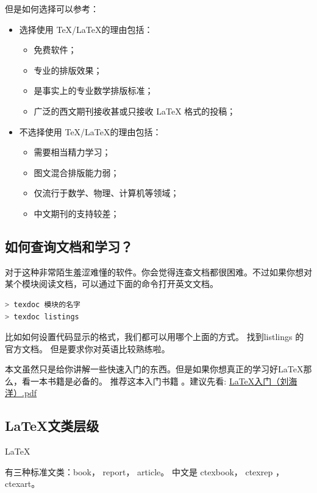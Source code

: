 \documentclass[UTF8,AutoFakeBold]{ctexart}
\numberwithin{figure}{section}
\numberwithin{table}{section}
\begin{document}
但是如何选择可以参考：
\begin{itemize}
    \item \Checkmark 选择使用 \TeX /\LaTeX 的理由包括：

          \begin{itemize}
              \item 免费软件；
              \item 专业的排版效果；
              \item 是事实上的专业数学排版标准；
              \item 广泛的西文期刊接收甚或只接收 LaTeX 格式的投稿；
          \end{itemize}

    \item \Checkmark 不选择使用 \TeX/\LaTeX 的理由包括：
          \begin{itemize}
              \item 需要相当精力学习；
              \item 图文混合排版能力弱；
              \item 仅流行于数学、物理、计算机等领域；
              \item 中文期刊的支持较差；
          \end{itemize}
\end{itemize}

\subsection{如何查询文档和学习？}
对于这种非常陌生羞涩难懂的软件。你会觉得连查文档都很困难。不过如果你想对某个模块阅读文档，可以通过下面的命令打开英文文档。

\begin{lstlisting}[language=bash]
> texdoc 模块的名字
> texdoc listings
\end{lstlisting}

比如如何设置代码显示的格式，我们都可以用哪个上面的方式。 找到listlings 的官方文档。 但是要求你对英语比较熟练啦。


本文虽然只是给你讲解一些快速入门的东西。但是如果你想真正的学习好\LaTeX 那么，看一本书籍是必备的。
推荐这本入门书籍\cite{latex_start} 。建议先看: \href{https://github.com/heartacker/MyNotes/blob/master/01.Latex/LaTeX_Docs_2014/04%20%E7%94%B5%E5%AD%90%E4%B9%A6/LaTeX%E5%85%A5%E9%97%A8%EF%BC%88%E5%88%98%E6%B5%B7%E6%B4%8B%EF%BC%89.pdf}{LaTeX入门（刘海洋）.pdf}


\subsection{\LaTeX 文类层级}
\label{sec:structure}
\hypertarget{Levelofdepth}{\LaTeX} 有三种标准文类：book， report， article。 中文是 ctexbook， ctexrep ， ctexart。
\end{document}

